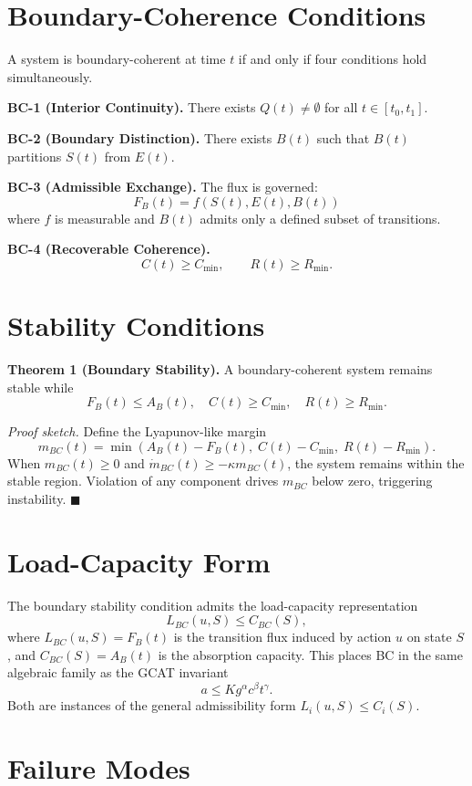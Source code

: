 \documentclass[letterpaper,10pt,conference]{ieeeconf}
\newcommand{\FB}{F_B}
\newcommand{\AB}{A_B}
\newcommand{\Coh}{C}
\newcommand{\Rec}{R}
\begin{document}
\section{Boundary-Coherence Conditions}

A system is boundary-coherent at time $t$ if and only if four conditions hold simultaneously.

\textbf{BC-1 (Interior Continuity).} There exists $Q(t) \ne \emptyset$ for all $t \in [t_0, t_1]$.

\textbf{BC-2 (Boundary Distinction).} There exists $B(t)$ such that $B(t)$ partitions $S(t)$ from $E(t)$.

\textbf{BC-3 (Admissible Exchange).} The flux is governed:
\[
\FB(t) = f(S(t), E(t), B(t))
\]
where $f$ is measurable and $B(t)$ admits only a defined subset of transitions.

\textbf{BC-4 (Recoverable Coherence).}
\[
\Coh(t) \ge C_{\min}, \qquad \Rec(t) \ge R_{\min}.
\]

\section{Stability Conditions}

\textbf{Theorem 1 (Boundary Stability).} A boundary-coherent system remains stable while
\[
\FB(t) \le \AB(t), \quad \Coh(t) \ge C_{\min}, \quad \Rec(t) \ge R_{\min}.
\]

\textit{Proof sketch.} Define the Lyapunov-like margin
\[
m_{BC}(t) = \min\!\left(\AB(t)-\FB(t),\; \Coh(t)-C_{\min},\; \Rec(t)-R_{\min}\right).
\]
When $m_{BC}(t) \ge 0$ and $\dot m_{BC}(t) \ge -\kappa m_{BC}(t)$, the system remains within the stable region. Violation of any component drives $m_{BC}$ below zero, triggering instability. \hfill $\blacksquare$

\section{Load-Capacity Form}

The boundary stability condition admits the load-capacity representation
\[
L_{BC}(u, S) \le C_{BC}(S),
\]
where $L_{BC}(u,S) = \FB(t)$ is the transition flux induced by action $u$ on state $S$, and $C_{BC}(S) = \AB(t)$ is the absorption capacity. This places BC in the same algebraic family as the GCAT invariant
\[
a \le K g^\alpha c^\beta t^\gamma.
\]
Both are instances of the general admissibility form $L_i(u,S) \le C_i(S)$.

\section{Failure Modes}
\end{document}
